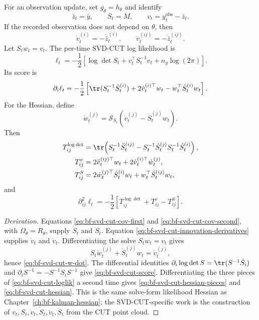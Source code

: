 For an observation update, set $g_\theta=h_\theta$ and identify
\[
  \bar z_t=\bar y,\qquad
  S_t=M,\qquad
  v_t=y_t^{\mathrm{obs}}-\bar z_t .
\]
If the recorded observation does not depend on $\theta$, then
\begin{equation}
\label{eq:bf-svd-cut-innovation-derivatives}
  \dot v_t^{(i)}=-\dot{\bar z}_t^{(i)},\qquad
  \ddot v_t^{(ij)}=-\ddot{\bar z}_t^{(ij)} .
\end{equation}
Let $S_tw_t=v_t$.  The per-time SVD-CUT log likelihood is
\begin{equation}
\label{eq:bf-svd-cut-loglik}
  \ell_t
  =
  -\frac{1}{2}
  \left[
    \log\det S_t+v_t^\top S_t^{-1}v_t+n_y\log(2\pi)
  \right].
\end{equation}
Its score is
\begin{equation}
\label{eq:bf-svd-cut-score}
  \partial_i\ell_t
  =
  -\frac{1}{2}
  \left[
    \tr(S_t^{-1}\dot S_t^{(i)})
    +2\dot v_t^{(i)\top}w_t
    -w_t^\top\dot S_t^{(i)}w_t
  \right].
\end{equation}
For the Hessian, define
\begin{equation}
\label{eq:bf-svd-cut-w-dot}
  \dot w_t^{(j)}
  =
  \mathcal{S}_{S_t}
  \left(\dot v_t^{(j)}-\dot S_t^{(j)}w_t\right).
\end{equation}
Then
\begin{align}
\label{eq:bf-svd-cut-hessian-pieces}
  T_{ij}^{\log\det}
  &=
  \tr\!\left(
    S_t^{-1}\ddot S_t^{(ij)}
    -S_t^{-1}\dot S_t^{(j)}S_t^{-1}\dot S_t^{(i)}
  \right),\\
  T_{ij}^{v}
  &=
  2\ddot v_t^{(ij)\top}w_t
  +2\dot v_t^{(i)\top}\dot w_t^{(j)},\\
  T_{ij}^{S}
  &=
  2\dot w_t^{(j)\top}\dot S_t^{(i)}w_t
  +w_t^\top\ddot S_t^{(ij)}w_t ,
\end{align}
and
\begin{equation}
\label{eq:bf-svd-cut-hessian}
  \partial_{ij}^2\ell_t
  =
  -\frac{1}{2}
  \left[
    T_{ij}^{\log\det}+T_{ij}^{v}-T_{ij}^{S}
  \right].
\end{equation}

\begin{proof}[Derivation]
Equations \eqref{eq:bf-svd-cut-cov-first} and
\eqref{eq:bf-svd-cut-cov-second}, with $\Omega_\theta=R_\theta$, supply
$\dot S_t$ and $\ddot S_t$.  Equation
\eqref{eq:bf-svd-cut-innovation-derivatives} supplies $\dot v_t$ and
$\ddot v_t$.  Differentiating the solve $S_tw_t=v_t$ gives
\[
  S_t\dot w_t^{(j)}+\dot S_t^{(j)}w_t=\dot v_t^{(j)},
\]
hence \eqref{eq:bf-svd-cut-w-dot}.  The differential identities
$\partial_i\log\det S=\tr(S^{-1}\dot S_i)$ and
$\partial_i S^{-1}=-S^{-1}\dot S_iS^{-1}$ give
\eqref{eq:bf-svd-cut-score}.  Differentiating the three pieces of
\eqref{eq:bf-svd-cut-loglik} a second time gives
\eqref{eq:bf-svd-cut-hessian-pieces} and
\eqref{eq:bf-svd-cut-hessian}.  This is the same solve-form likelihood
Hessian as Chapter~\ref{ch:bf-kalman-hessian}; the SVD-CUT-specific work is the
construction of $v_t,S_t,\dot v_t,\dot S_t,\ddot v_t,\ddot S_t$ from the CUT
point cloud.
\end{proof}

